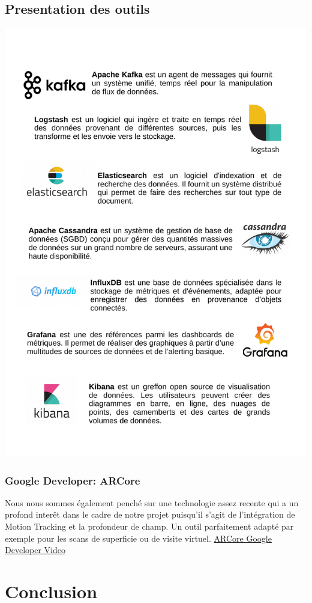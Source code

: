 \documentclass[12pt]{report}
\begin{document}
\section{Presentation des outils}
\includegraphics[width=16cm]{pdfinc/Outils.pdf}
\subsection{Google Developer: ARCore}
Nous nous sommes également penché sur une technologie assez recente qui a un profond interêt dans le cadre de notre projet puisqu'il
s'agit de l'intégration de Motion Tracking et la profondeur de champ. Un outil parfaitement adapté par exemple pour les scans de superficie
ou de visite virtuel.
\href{https://www.youtube.com/watch?v=NhJydpMkpug}{ARCore Google Developer Video}


\chapter{Conclusion}
\end{document}
